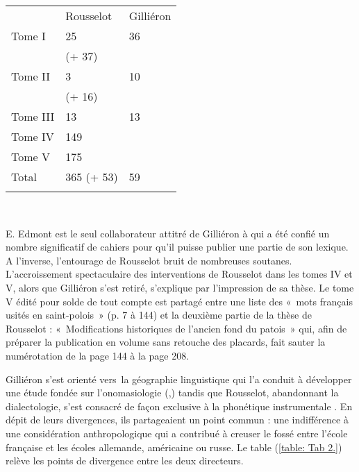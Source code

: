 \documentclass[output=paper]{langsci/langscibook}
\begin{document}
\begin{table}
\begin{tabularx}{\textwidth}{X X X}


  &    Rousselot    &    Gilliéron \\

Tome I   &   25       &         36 \\

  &    (+ 37)   & \\

Tome II  &  3            &    10 \\

  &    (+ 16)   & \\

Tome III  &  13       &         13 \\

Tome IV  &   149  & \\

Tome V  &  175      &    \\

Total   &   365 (+ 53)     &         59\\ \medskip
\end{tabularx}
\\


\label{table: Tab.1}

\end{table}

E. Edmont est le seul collaborateur attitré de Gilliéron à qui a été confié un nombre significatif de cahiers pour qu’il puisse publier une partie de son lexique. A l’inverse, l’entourage de Rousselot bruit de nombreuses soutanes. L’accroissement spectaculaire des interventions de Rousselot dans les tomes IV et V, alors que Gilliéron s’est retiré, s’explique par l’impression de sa thèse. Le tome V édité pour solde de tout compte est partagé entre une liste des «~mots français usités en saint-polois~» (p. 7 à 144) et la deuxième partie de la thèse de Rousselot : «~Modifications historiques de l’ancien fond du patois~» qui, afin de préparer la publication en volume sans retouche des placards, fait sauter la numérotation de la page 144 à la page 208.

Gilliéron s’est orienté vers~la géographie linguistique qui l’a conduit à développer une étude fondée sur l’onomasiologie (\citeyear{gillieron_scier_1905},\citeyear{gillieron_genealogie_1918}) tandis que Rousselot, abandonnant la dialectologie, s’est consacré de façon exclusive à la phonétique instrumentale \citeyear{rousselot_principes_1897}. En dépit de leurs divergences, ils partageaient un point commun : une indifférence à une considération anthropologique qui a contribué à creuser le fossé entre l’école française et les écoles allemande, américaine ou russe. Le table (\ref{table: Tab 2.}) relève les points de divergence entre les deux directeurs.
\end{document}

